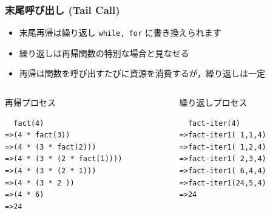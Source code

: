 \begin{frame}[fragile]
\frametitle{末尾呼び出し (Tail Call)}
  \begin{itemize}
\scriptsize
\item 末尾再帰は繰り返し {\tt while, for} に書き換えられます
\item 繰り返しは再帰関数の特別な場合と見なせる
\item 再帰は関数を呼び出すたびに資源を消費するが，繰り返しは一定
  \end{itemize}
  \begin{columns}
    \begin{column}{0.5\textwidth}
      \begin{itembox}{再帰プロセス}
\scriptsize
        \begin{verbatim}
  fact(4)
=>(4 * fact(3))
=>(4 * (3 * fact(2)))
=>(4 * (3 * (2 * fact(1))))
=>(4 * (3 * (2 * 1)))
=>(4 * (3 * 2 ))
=>(4 * 6)
=>24
        \end{verbatim}
      \end{itembox}
    \end{column}
    \begin{column}{0.45\textwidth}
      \begin{itembox}{繰り返しプロセス}
\scriptsize
        \begin{verbatim}
  fact-iter(4)
=>fact-iter1( 1,1,4)
=>fact-iter1( 1,2,4)
=>fact-iter1( 2,3,4)
=>fact-iter1( 6,4,4)
=>fact-iter1(24,5,4)
=>24
        \end{verbatim}
      \end{itembox}
    \end{column}
  \end{columns}
\end{frame}
%
%

